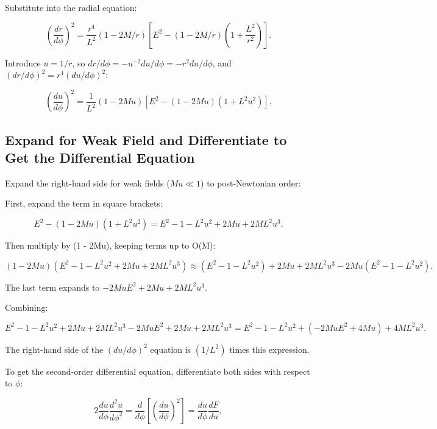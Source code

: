 \documentclass{article}
\begin{document}
Substitute into the radial equation:

\begin{equation}
 \left(\frac{dr}{d\phi}\right)^2 = \frac{r^4}{L^2} (1 - 2M/r) \left[ E^2 - (1 - 2M/r) \left(1 + \frac{L^2}{r^2}\right) \right].
\end{equation}

Introduce \(u = 1/r\), so \( dr / d\phi = - u^{-2} du / d\phi = - r^2 du / d\phi \), and \((dr/d\phi)^2 = r^4 (du/d\phi)^2\):

\begin{equation}
 \left(\frac{du}{d\phi}\right)^2 = \frac{1}{L^2} (1 - 2Mu) \left[ E^2 - (1 - 2Mu) (1 + L^2 u^2) \right].
\end{equation}

\subsection{Expand for Weak Field and Differentiate to Get the Differential Equation}

Expand the right-hand side for weak fields (\(M u \ll 1\)) to post-Newtonian order:

First, expand the term in square brackets:

\begin{equation}
 E^2 - (1 - 2Mu) (1 + L^2 u^2) = E^2 - 1 - L^2 u^2 + 2Mu + 2M L^2 u^3.
\end{equation}

Then multiply by (1 - 2Mu), keeping terms up to O(M):

\begin{equation}
 (1 - 2Mu) (E^2 - 1 - L^2 u^2 + 2Mu + 2M L^2 u^3) \approx (E^2 - 1 - L^2 u^2) + 2Mu + 2M L^2 u^3 - 2Mu (E^2 - 1 - L^2 u^2).
\end{equation}

The last term expands to \(-2Mu E^2 + 2Mu + 2M L^2 u^3\).

Combining:

\begin{equation}
 E^2 - 1 - L^2 u^2 + 2Mu + 2M L^2 u^3 - 2Mu E^2 + 2Mu + 2M L^2 u^3 = E^2 - 1 - L^2 u^2 + (-2Mu E^2 + 4Mu) + 4M L^2 u^3.
\end{equation}

The right-hand side of the \((du/d\phi)^2\) equation is \((1/L^2)\) times this expression.

To get the second-order differential equation, differentiate both sides with respect to \(\phi\):

\begin{equation}
 2 \frac{du}{d\phi} \frac{d^2 u}{d\phi^2} = \frac{d}{d\phi} \left[ \left(\frac{du}{d\phi}\right)^2 \right] = \frac{du}{d\phi} \frac{d F}{du},
\end{equation}
\end{document}
